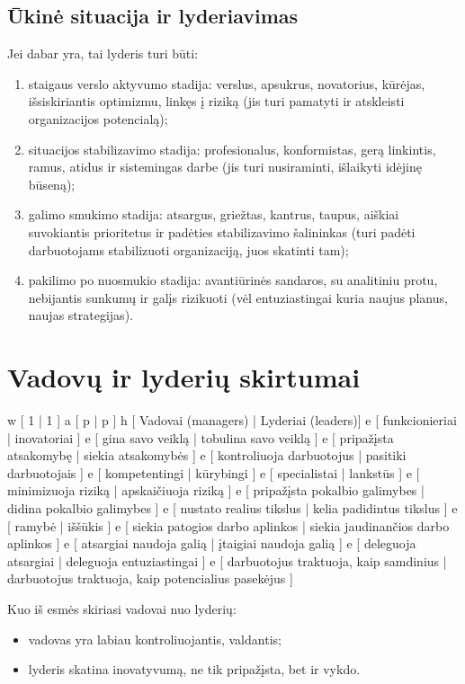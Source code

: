 \subsection{Ūkinė situacija ir lyderiavimas}

Jei dabar yra, tai lyderis turi būti:
\begin{enumerate}
  \item staigaus verslo aktyvumo stadija: verslus, apsukrus, novatorius,
    kūrėjas, išsiskiriantis optimizmu, linkęs į riziką (jis turi pamatyti
    ir atskleisti organizacijos potencialą);
  \item situacijos stabilizavimo stadija: profesionalus, konformistas,
    gerą linkintis, ramus, atidus ir sistemingas darbe (jis turi 
    nusiraminti, išlaikyti idėjinę būseną);
  \item galimo smukimo stadija: atsargus, griežtas, kantrus, taupus,
    aiškiai suvokiantis prioritetus ir padėties stabilizavimo šalininkas
    (turi padėti darbuotojams stabilizuoti organizaciją, juos skatinti
    tam);
  \item pakilimo po nuosmukio stadija: avantiūrinės sandaros, su
    analitiniu protu, nebijantis sunkumų ir galįs rizikuoti
    (vėl entuziastingai kuria naujus planus, naujas strategijas).
\end{enumerate}

\section{Vadovų ir lyderių skirtumai}

\xtable
{
  w [ 1 | 1 ]
  a [ p | p ]
  h [ Vadovai (managers) | Lyderiai (leaders)]
  e [ funkcionieriai | inovatoriai ]
  e [ gina savo veiklą | tobulina savo veiklą ]
  e [ pripažįsta atsakomybę | siekia atsakomybės ]
  e [ kontroliuoja darbuotojus | pasitiki darbuotojais ]
  e [ kompetentingi | kūrybingi ]
  e [ specialistai | lankstūs ]
  e [ minimizuoja riziką | apskaičiuoja riziką ]
  e [ pripažįsta pokalbio galimybes | didina pokalbio galimybes ]
  e [ nustato realius tikslus | kelia padidintus tikslus ]
  e [ ramybė | iššūkis ]
  e [ siekia patogios darbo aplinkos | siekia jaudinančios darbo aplinkos ]
  e [ atsargiai naudoja galią | įtaigiai naudoja galią ]
  e [ deleguoja atsargiai | deleguoja entuziastingai ]
  e [ darbuotojus traktuoja, kaip samdinius
    | darbuotojus traktuoja, kaip potencialius pasekėjus ]
}

Kuo iš esmės skiriasi vadovai nuo lyderių:
\begin{itemize}
  \item vadovas yra labiau kontroliuojantis, valdantis;
  \item lyderis skatina inovatyvumą, ne tik pripažįsta, bet ir vykdo.
\end{itemize}
